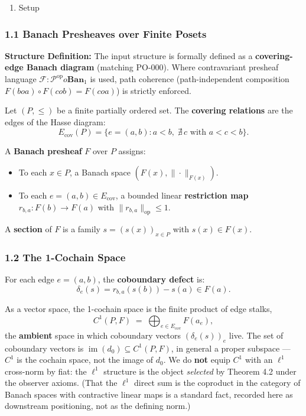 \documentclass[
  11pt,
]{article}
\providecommand{\tightlist}{%
  \setlength{\itemsep}{0pt}\setlength{\parskip}{0pt}}
\providecommand{\tightlist}{%
  \setlength{\itemsep}{0pt}\setlength{\parskip}{0pt}}
\renewenvironment{quote}
  {\begin{leftbar}\small}
  {\end{leftbar}}
\begin{document}
\begin{enumerate}
\def\labelenumi{\arabic{enumi}.}
\tightlist
\item
  Setup
\end{enumerate}

\subsubsection{1.1 Banach Presheaves over Finite Posets}\label{banach-presheaves-over-finite-posets}

\begin{quote}
\textbf{Structure Definition:} The input structure is formally defined as a \textbf{covering-edge Banach diagram} (matching PO-000). Where contravariant presheaf language \(\mathcal{F} : \mathcal{P}^{\mathrm{op}}  o \mathbf{Ban}_1\) is used, path coherence (path-independent composition \(F(b  o a) \circ F(c  o b) = F(c  o a)\)) is strictly enforced.

Let \((P, \leq)\) be a finite partially ordered set. The \textbf{covering relations} are the edges of the Hasse diagram:
\[E_{\text{cov}}(P) = \{e = (a, b) : a < b,\; \nexists\, c \text{ with } a < c < b\}.\]
\end{quote}

A \textbf{Banach presheaf} \(F\) over \(P\) assigns:

\begin{itemize}
\tightlist
\item
  To each \(x \in P\), a Banach space \((F(x), \|\cdot\|_{F(x)})\).
\item
  To each \(e = (a, b) \in E_{\text{cov}}\), a bounded linear \textbf{restriction map} \(r_{b,a}: F(b) \to F(a)\) with \(\|r_{b,a}\|_{\text{op}} \leq 1\).
\end{itemize}

A \textbf{section} of \(F\) is a family \(s = (s(x))_{x \in P}\) with \(s(x) \in F(x)\).

\subsubsection{1.2 The 1-Cochain Space}\label{the-1-cochain-space}

For each edge \(e = (a, b)\), the \textbf{coboundary defect} is:
\[\delta_e(s) = r_{b,a}(s(b)) - s(a) \in F(a).\]

As a vector space, the 1-cochain space is the finite product of edge stalks,
\[C^1(P,F) \;=\; \bigoplus_{e\in E_{\mathrm{cov}}} F(a_e),\]
the \textbf{ambient} space in which coboundary vectors \((\delta_e(s))_e\) live. The set of coboundary vectors is \(\operatorname{im}(d_0)\subseteq C^1(P,F)\), in general a proper subspace --- \(C^1\) is the cochain space, not the image of \(d_0\). We do \textbf{not} equip \(C^1\) with an \(\ell^1\) cross-norm by fiat: the \(\ell^1\) structure is the object \emph{selected} by Theorem 4.2 under the observer axioms. (That the \(\ell^1\) direct sum is the coproduct in the category of Banach spaces with contractive linear maps is a standard fact, recorded here as downstream positioning, not as the defining norm.)
\end{document}
